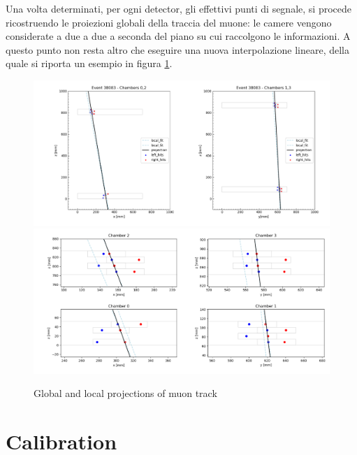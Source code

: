 \documentclass[a4paper,11pt]{book}
\begin{document}
Una volta determinati, per ogni detector, gli effettivi punti di segnale, si procede ricostruendo le proiezioni globali della traccia del muone: le camere vengono considerate a due a due a seconda del piano su cui raccolgono le informazioni. A questo punto non resta altro che eseguire una nuova interpolazione lineare, della quale si riporta un esempio in figura \ref{fig:glob_proj_ex}.\\

\begin{figure}[hbtp]
\centering
\includegraphics[scale=0.4]{pictures/example_track2D.pdf}
\includegraphics[scale=0.4]{pictures/example_track2D_dets.pdf}
\caption{Global and local projections of muon track}
\label{fig:glob_proj_ex}
\end{figure}


\section{Calibration}
\end{document}
